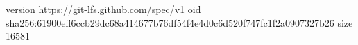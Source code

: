 version https://git-lfs.github.com/spec/v1
oid sha256:61900eff6ccb29dc68a414677b76df54f4e4d0c6d520f747fc1f2a0907327b26
size 16581
